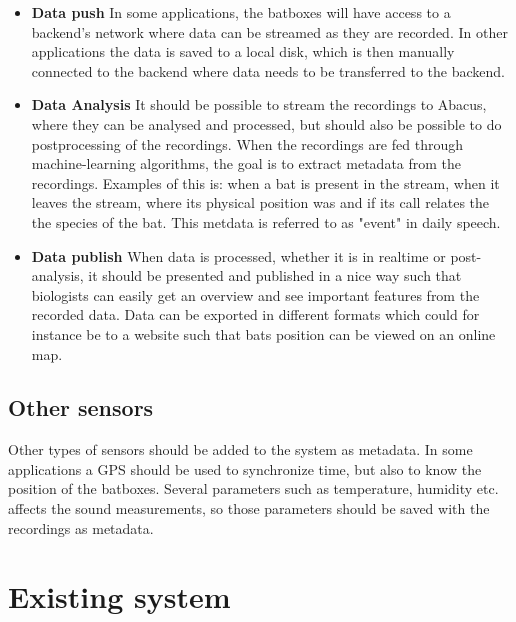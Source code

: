 \begin{itemize}
	\item \textbf{Data push} In some applications, the batboxes will have access to a backend’s network where data can be streamed as they are recorded. In other applications the data is saved to a local disk, which is then manually connected to the backend where data needs to be transferred to the backend.
	
	\item \textbf{Data Analysis} It should be possible to stream the recordings to Abacus, where they can be analysed and processed, but should also be possible to do postprocessing of the recordings. When the recordings are fed through machine-learning algorithms, the goal is to extract metadata from the recordings. Examples of this is: when a bat is present in the stream, when it leaves the stream, where its physical position was and if its call relates the the species of the bat. This metdata is referred to as "event" in daily speech.

	\item \textbf{Data publish} When data is processed, whether it is in realtime or post-analysis, it should be presented and published in a nice way such that biologists can easily get an overview and see important features from the recorded data. Data can be exported in different formats which could for instance be to a website such that bats position can be viewed on an online map.

\end{itemize}


\subsection{Other sensors}
Other types of sensors should be added to the system as metadata. In some applications a GPS should be used to synchronize time, but also to know the position of the batboxes. Several parameters such as temperature, humidity etc. affects the sound measurements, so those parameters should be saved with the recordings as metadata. 

\section{Existing system}

